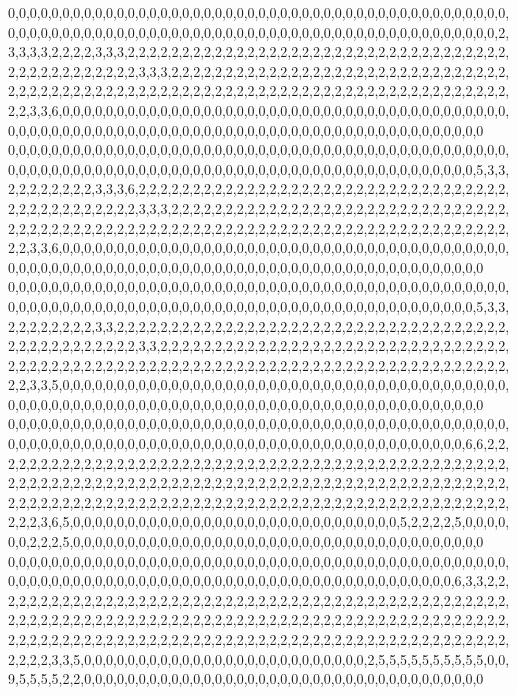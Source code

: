 0,0,0,0,0,0,0,0,0,0,0,0,0,0,0,0,0,0,0,0,0,0,0,0,0,0,0,0,0,0,0,0,0,0,0,0,0,0,0,0,0,0,0,0,0,0,0,0,0,0,0,0,0,0,0,0,0,0,0,0,0,0,0,0,0,0,0,0,0,0,0,0,0,0,0,0,0,0,0,0,0,0,0,0,0,0,0,0,0,0,0,2,3,3,3,3,2,2,2,2,3,3,3,2,2,2,2,2,2,2,2,2,2,2,2,2,2,2,2,2,2,2,2,2,2,2,2,2,2,2,2,2,2,2,2,2,2,2,2,2,2,2,2,2,2,2,2,2,2,2,3,3,3,2,2,2,2,2,2,2,2,2,2,2,2,2,2,2,2,2,2,2,2,2,2,2,2,2,2,2,2,2,2,2,2,2,2,2,2,2,2,2,2,2,2,2,2,2,2,2,2,2,2,2,2,2,2,2,2,2,2,2,2,2,2,2,2,2,2,2,2,2,2,2,2,2,2,2,2,2,2,2,3,3,6,0,0,0,0,0,0,0,0,0,0,0,0,0,0,0,0,0,0,0,0,0,0,0,0,0,0,0,0,0,0,0,0,0,0,0,0,0,0,0,0,0,0,0,0,0,0,0,0,0,0,0,0,0,0,0,0,0,0,0,0,0,0,0,0,0,0,0,0,0,0,0,0,0,0,0,0,0,0,0,0,0,0,0,0,0
0,0,0,0,0,0,0,0,0,0,0,0,0,0,0,0,0,0,0,0,0,0,0,0,0,0,0,0,0,0,0,0,0,0,0,0,0,0,0,0,0,0,0,0,0,0,0,0,0,0,0,0,0,0,0,0,0,0,0,0,0,0,0,0,0,0,0,0,0,0,0,0,0,0,0,0,0,0,0,0,0,0,0,0,0,0,0,0,0,5,3,3,2,2,2,2,2,2,2,2,3,3,3,6,2,2,2,2,2,2,2,2,2,2,2,2,2,2,2,2,2,2,2,2,2,2,2,2,2,2,2,2,2,2,2,2,2,2,2,2,2,2,2,2,2,2,2,2,2,2,3,3,3,2,2,2,2,2,2,2,2,2,2,2,2,2,2,2,2,2,2,2,2,2,2,2,2,2,2,2,2,2,2,2,2,2,2,2,2,2,2,2,2,2,2,2,2,2,2,2,2,2,2,2,2,2,2,2,2,2,2,2,2,2,2,2,2,2,2,2,2,2,2,2,2,2,2,2,2,2,2,2,3,3,6,0,0,0,0,0,0,0,0,0,0,0,0,0,0,0,0,0,0,0,0,0,0,0,0,0,0,0,0,0,0,0,0,0,0,0,0,0,0,0,0,0,0,0,0,0,0,0,0,0,0,0,0,0,0,0,0,0,0,0,0,0,0,0,0,0,0,0,0,0,0,0,0,0,0,0,0,0,0,0,0,0,0,0,0,0
0,0,0,0,0,0,0,0,0,0,0,0,0,0,0,0,0,0,0,0,0,0,0,0,0,0,0,0,0,0,0,0,0,0,0,0,0,0,0,0,0,0,0,0,0,0,0,0,0,0,0,0,0,0,0,0,0,0,0,0,0,0,0,0,0,0,0,0,0,0,0,0,0,0,0,0,0,0,0,0,0,0,0,0,0,0,0,0,0,5,3,3,2,2,2,2,2,2,2,2,3,3,2,2,2,2,2,2,2,2,2,2,2,2,2,2,2,2,2,2,2,2,2,2,2,2,2,2,2,2,2,2,2,2,2,2,2,2,2,2,2,2,2,2,2,2,2,2,2,2,3,3,2,2,2,2,2,2,2,2,2,2,2,2,2,2,2,2,2,2,2,2,2,2,2,2,2,2,2,2,2,2,2,2,2,2,2,2,2,2,2,2,2,2,2,2,2,2,2,2,2,2,2,2,2,2,2,2,2,2,2,2,2,2,2,2,2,2,2,2,2,2,2,2,2,2,2,2,2,2,2,2,3,3,5,0,0,0,0,0,0,0,0,0,0,0,0,0,0,0,0,0,0,0,0,0,0,0,0,0,0,0,0,0,0,0,0,0,0,0,0,0,0,0,0,0,0,0,0,0,0,0,0,0,0,0,0,0,0,0,0,0,0,0,0,0,0,0,0,0,0,0,0,0,0,0,0,0,0,0,0,0,0,0,0,0,0,0,0,0
0,0,0,0,0,0,0,0,0,0,0,0,0,0,0,0,0,0,0,0,0,0,0,0,0,0,0,0,0,0,0,0,0,0,0,0,0,0,0,0,0,0,0,0,0,0,0,0,0,0,0,0,0,0,0,0,0,0,0,0,0,0,0,0,0,0,0,0,0,0,0,0,0,0,0,0,0,0,0,0,0,0,0,0,0,0,0,0,6,6,2,2,2,2,2,2,2,2,2,2,2,2,2,2,2,2,2,2,2,2,2,2,2,2,2,2,2,2,2,2,2,2,2,2,2,2,2,2,2,2,2,2,2,2,2,2,2,2,2,2,2,2,2,2,2,2,2,2,2,2,2,2,2,2,2,2,2,2,2,2,2,2,2,2,2,2,2,2,2,2,2,2,2,2,2,2,2,2,2,2,2,2,2,2,2,2,2,2,2,2,2,2,2,2,2,2,2,2,2,2,2,2,2,2,2,2,2,2,2,2,2,2,2,2,2,2,2,2,2,2,2,2,2,2,2,2,2,2,2,2,2,2,2,3,6,5,0,0,0,0,0,0,0,0,0,0,0,0,0,0,0,0,0,0,0,0,0,0,0,0,0,0,0,0,0,0,5,2,2,2,2,5,0,0,0,0,0,0,2,2,2,5,0,0,0,0,0,0,0,0,0,0,0,0,0,0,0,0,0,0,0,0,0,0,0,0,0,0,0,0,0,0,0,0,0,0,0,0,0,0
0,0,0,0,0,0,0,0,0,0,0,0,0,0,0,0,0,0,0,0,0,0,0,0,0,0,0,0,0,0,0,0,0,0,0,0,0,0,0,0,0,0,0,0,0,0,0,0,0,0,0,0,0,0,0,0,0,0,0,0,0,0,0,0,0,0,0,0,0,0,0,0,0,0,0,0,0,0,0,0,0,0,0,0,0,0,0,6,3,3,2,2,2,2,2,2,2,2,2,2,2,2,2,2,2,2,2,2,2,2,2,2,2,2,2,2,2,2,2,2,2,2,2,2,2,2,2,2,2,2,2,2,2,2,2,2,2,2,2,2,2,2,2,2,2,2,2,2,2,2,2,2,2,2,2,2,2,2,2,2,2,2,2,2,2,2,2,2,2,2,2,2,2,2,2,2,2,2,2,2,2,2,2,2,2,2,2,2,2,2,2,2,2,2,2,2,2,2,2,2,2,2,2,2,2,2,2,2,2,2,2,2,2,2,2,2,2,2,2,2,2,2,2,2,2,2,2,2,2,2,2,2,2,2,3,3,5,0,0,0,0,0,0,0,0,0,0,0,0,0,0,0,0,0,0,0,0,0,0,0,0,0,0,2,5,5,5,5,5,5,5,5,5,5,0,0,9,5,5,5,5,2,2,0,0,0,0,0,0,0,0,0,0,0,0,0,0,0,0,0,0,0,0,0,0,0,0,0,0,0,0,0,0,0,0,0,0,0,0,0
